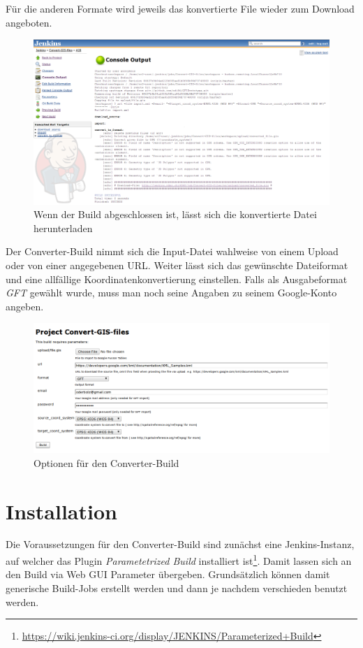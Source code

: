 Für die anderen Formate wird jeweils das konvertierte File wieder zum Download angeboten.

\begin{figure}[!ht]
	\centering
	\includegraphics[width=\textwidth]{images/converter-build/converter-build-done}
	\caption{Wenn der Build abgeschlossen ist, lässt sich die konvertierte Datei herunterladen}
	\label{converter-build-done}
\end{figure}

Der Converter-Build nimmt sich die Input-Datei wahlweise von einem Upload oder von einer angegebenen URL. Weiter lässt sich das gewünschte Dateiformat und eine allfällige Koordinatenkonvertierung einstellen. Falls als Ausgabeformat \emph{GFT} gewählt wurde, muss man noch seine Angaben zu seinem Google-Konto angeben.

\begin{figure}[!ht]
	\centering
	\includegraphics[width=\textwidth]{images/converter-build/converter-build-import}
	\caption{Optionen für den Converter-Build}
	\label{converter-build-import}
\end{figure}

\section{Installation}
Die Voraussetzungen für den Converter-Build sind zunächst eine Jenkins-Instanz, auf welcher das Plugin \emph{Parametetrized Build} installiert ist\footnote{\url{https://wiki.jenkins-ci.org/display/JENKINS/Parameterized+Build}}. Damit lassen sich an den Build via Web GUI Parameter übergeben. Grundsätzlich können damit generische Build-Jobs erstellt werden und dann je nachdem verschieden benutzt werden. 

